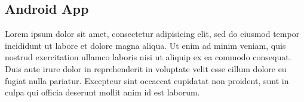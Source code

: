 \subsection{Android App}

Lorem ipsum dolor sit amet, consectetur adipisicing elit, sed do eiusmod
tempor incididunt ut labore et dolore magna aliqua. Ut enim ad minim veniam,
quis nostrud exercitation ullamco laboris nisi ut aliquip ex ea commodo
consequat. Duis aute irure dolor in reprehenderit in voluptate velit esse
cillum dolore eu fugiat nulla pariatur. Excepteur sint occaecat cupidatat non
proident, sunt in culpa qui officia deserunt mollit anim id est laborum.









